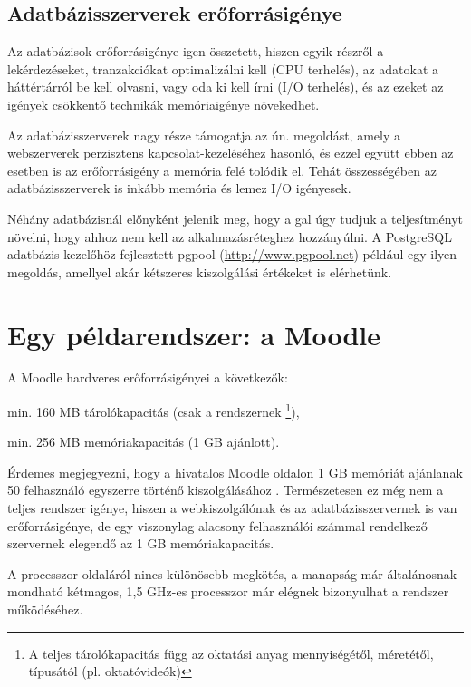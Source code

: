 \subsection{Adatbázisszerverek erőforrásigénye}

Az adatbázisok erőforrásigénye igen összetett, hiszen egyik részről a lekérdezéseket, tranzakciókat optimalizálni kell (CPU terhelés), az adatokat a háttértárról be kell olvasni, vagy oda ki kell írni (I/O terhelés), és az ezeket az igények csökkentő technikák memóriaigénye növekedhet.

Az adatbázisszerverek nagy része támogatja az ún.  megoldást, amely a webszerverek perzisztens kapcsolat-kezeléséhez hasonló, és ezzel együtt ebben az esetben is az erőforrásigény a memória felé tolódik el. Tehát összességében az adatbázisszerverek is inkább memória és lemez I/O igényesek.

Néhány adatbázisnál előnyként jelenik meg, hogy a gal úgy tudjuk a teljesítményt növelni, hogy ahhoz nem kell az alkalmazásréteghez hozzányúlni. A PostgreSQL adatbázis-kezelőhöz fejlesztett pgpool (\href{http://www.pgpool.net}{http://www.pgpool.net}) például egy ilyen megoldás, amellyel akár kétszeres kiszolgálási értékeket is elérhetünk.

\section{Egy példarendszer: a Moodle}
A Moodle hardveres erőforrásigényei a következők:
\begin{sajat_itemize}
\item min. 160 MB tárolókapacitás (csak a rendszernek \footnote{A teljes tárolókapacitás függ az oktatási anyag mennyiségétől, méretétől, típusától (pl. oktatóvideók)}),
\item min. 256 MB memóriakapacitás (1 GB ajánlott).
\end{sajat_itemize}
Érdemes megjegyezni, hogy a hivatalos Moodle oldalon 1 GB memóriát ajánlanak 50 felhasználó egyszerre történő kiszolgálásához \cite{moodleinst}.
Természetesen ez még nem a teljes rendszer igénye, hiszen a webkiszolgálónak és az adatbázisszervernek is van erőforrásigénye, de egy viszonylag alacsony felhasználói számmal rendelkező szervernek elegendő az 1 GB memóriakapacitás.

A processzor oldaláról nincs különösebb megkötés, a manapság már általánosnak mondható kétmagos, 1,5 GHz-es processzor már elégnek bizonyulhat a rendszer működéséhez.

